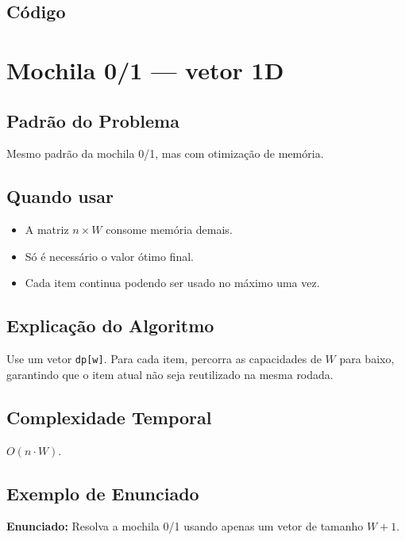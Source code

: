 \subsection{Código}

\section{Mochila 0/1 --- vetor 1D}

\subsection{Padrão do Problema}
Mesmo padrão da mochila 0/1, mas com otimização de memória.

\subsection{Quando usar}
\begin{itemize}[nosep]
  \item A matriz $n \times W$ consome memória demais.
  \item Só é necessário o valor ótimo final.
  \item Cada item continua podendo ser usado no máximo uma vez.
\end{itemize}

\subsection{Explicação do Algoritmo}
Use um vetor \texttt{dp[w]}. Para cada item, percorra as capacidades de $W$ para baixo, garantindo que o item atual não seja reutilizado na mesma rodada.

\subsection{Complexidade Temporal}
$O(n \cdot W)$.

\subsection{Exemplo de Enunciado}
\begin{exemplodiabox}
\textbf{Enunciado:} Resolva a mochila 0/1 usando apenas um vetor de tamanho $W+1$.
\end{exemplodiabox}

